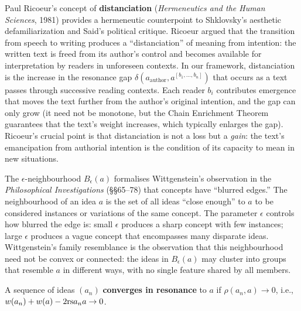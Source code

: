 \begin{remark}
\label{rem:ch11:neighbourhood_wittgenstein}

\begin{remark}
\label{rem:ch11:ricoeur_distanciation}
Paul Ricoeur's concept of \textbf{distanciation} (\emph{Hermeneutics and
the Human Sciences}, 1981) provides a hermeneutic counterpoint to
Shklovsky's aesthetic defamiliarization and Said's political critique.
Ricoeur argued that the transition from speech to writing produces a
``distanciation'' of meaning from intention: the written text is freed from
its author's control and becomes available for interpretation by readers in
unforeseen contexts.  In our framework, distanciation is the increase in the
resonance gap $\delta(a_{\mathrm{author}}, a^{[b_1,\ldots,b_n]})$ that
occurs as a text passes through successive reading contexts.  Each reader
$b_i$ contributes emergence that moves the text further from the author's
original intention, and the gap can only grow (it need not be monotone, but
the Chain Enrichment Theorem guarantees that the text's weight increases,
which typically enlarges the gap).  Ricoeur's crucial point is that
distanciation is not a loss but a \emph{gain}: the text's emancipation from
authorial intention is the condition of its capacity to mean in new
situations.
\end{remark}


The $\epsilon$-neighbourhood $B_\epsilon(a)$ formalises Wittgenstein's
observation in the \emph{Philosophical Investigations} (\S\S65--78) that
concepts have ``blurred edges.''  The neighbourhood of an idea $a$ is the
set of all ideas ``close enough'' to $a$ to be considered instances or
variations of the same concept.  The parameter $\epsilon$ controls how
blurred the edge is: small $\epsilon$ produces a sharp concept with few
instances; large $\epsilon$ produces a vague concept that encompasses many
disparate ideas.  Wittgenstein's family resemblance is the observation that
this neighbourhood need not be convex or connected: the ideas in
$B_\epsilon(a)$ may cluster into groups that resemble $a$ in different ways,
with no single feature shared by all members.
\end{remark}



\begin{definition}
\label{def:convergence}
A sequence of ideas $(a_n)$ \textbf{converges in resonance} to $a$ if
$\rho(a_n, a) \to 0$, i.e., $w(a_n) + w(a) - 2\mathrm{rs}{a_n}{a} \to 0$.
\end{definition}

